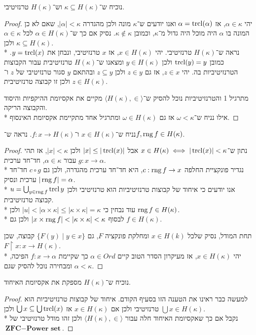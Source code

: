 \Question{}
נוכיח ש־$\kappa \subseteq H(\kappa)$ וש־$H(\kappa)$ טרנזיטיבי.
\begin{proof}
	יהי $\alpha \in \kappa$, אז $\alpha = \operatorname{trcl}(\alpha)$ ואנו יודעים ש־$\kappa$ מונה ולכן מהגדרה $|\alpha| < \kappa$, שאם לא כן המונה בו $\alpha$ היה מוכל היה גדול מ־$\kappa$, וכמובן $\kappa \notin \kappa$.
	נסיק אם כך ש־$\alpha \in H(\kappa)$ לכל $\alpha \in \kappa$ ולכן $\kappa \subseteq H(\kappa)$. \\*
	נראה ש־$H(\kappa)$ טרנזיטיבי.
	יהי $x \in H(\kappa)$, אז $x$ טרנזיטיבי, ונבחן את $y = \operatorname{trcl}(x)$. כמובן $\operatorname{trcl}(y) = y$ ולכן $y \in H(\kappa)$ ומצאנו ש־$H(\kappa)$ טרנזיטיבית עבור הקבוצות הטרנזיטיביות בה.
	יהי $z \in x$, אז גם $z \in y$ ולכן $z \subseteq y$ ובהתאם $y$ סגור טרנזיטיבי של $z$ ו־$z \in H(\kappa)$ ולכן זו קבוצה טרנזיטיבית.

	מתרגיל 1 והטרנזיטיביות נוכל להסיק ש־$\langle H(\kappa), \in \rangle$ מקיים את אקסיומת ההיקפיות והיסוד והקבוצה הריקה. \\*
	אילו נניח ש־$\omega < \kappa$ אז גם $\omega \in H(\kappa)$ ומתרגיל אחד מתקיימת אקסיומת האינסוף.
\end{proof}

\Question{}
נניח ש־$x \in H(\kappa)$ ו־$f : x \to H(\kappa)$.
נראה ש־$f, \operatorname{rng} f \in H(\kappa)$.
\begin{proof}
	נתון ש־$x \in H(\kappa) \iff |\operatorname{trcl}(x)| < \kappa$ אבל $|x| \le |\operatorname{trcl}(x)|$ ולכן $|x| < \kappa$, אז תהי $g : x \to \alpha$ עבור $\alpha \in \kappa$, חד־חד ערכית. \\*
	נגדיר פונקציית החלפה $c : \operatorname{rng} f \to x$, היא חד־חד ערכית מהגדרה, ולכן גם $c \circ g$ חד־חד ערכית ונסיק $|\operatorname{rng} f| = \alpha$. \\*
	אנו יודעים כי איחוד של קבוצות טרנזיטיביות הוא טרנזיטיבי ולכן $u = \bigcup_{y \in \operatorname{rng} f} \operatorname{trcl} y$ קבוצה טרנזיטיבית. \\*
	עוד נבחין כי $|u| < |\alpha \times \kappa| \le |\kappa \times \kappa| = \kappa$ ולכן $\operatorname{rng} f \in H(\kappa)$. \\*
	לבסוף $|x \times \operatorname{rng} f| < |\kappa \times \kappa| < \kappa$ ולכן גם $f \in H(\kappa)$.

	תחת המודל, נסיק שלכל $x \in H(k)$ ומחלקת פונקציה $F$, גם $\{F(y) \mid y \in x\}$ קבוצה, שכן $F \upharpoonright x : x \to H(\kappa)$. \\*
	יהי $x \in H(\kappa)$, אז מעיקרון הסדר הטוב קיים $\alpha \in Ord$ כך שקיימת $f : x \to \alpha$ הפיכה, ומבחירה נוכל להסיק שגם $\alpha < \kappa$.
\end{proof}

\Question{}
נוכיח ש־$H(\kappa)$ מספקת את אקסיומת האיחוד.
\begin{proof}
	למעשה כבר ראינו את הטענה הזו בסעיף הקודם.
	איחוד של קבוצות טרנזיטיביות הוא טרנזיטיבי ולכן אם $x \in H(\kappa)$ אז $\bigcup x \subseteq \bigcup \operatorname{trcl}(x)$ ולכן $\bigcup x \in H(\kappa)$. \\*
	נקבל אם כך שאקסיומת האיחוד חלה עבור $\langle H(\kappa), \in \rangle$ ולכן זהו מודל טרנזיטיבי של $\textbf{ZFC} - \textbf{Power set}$.
\end{proof}

